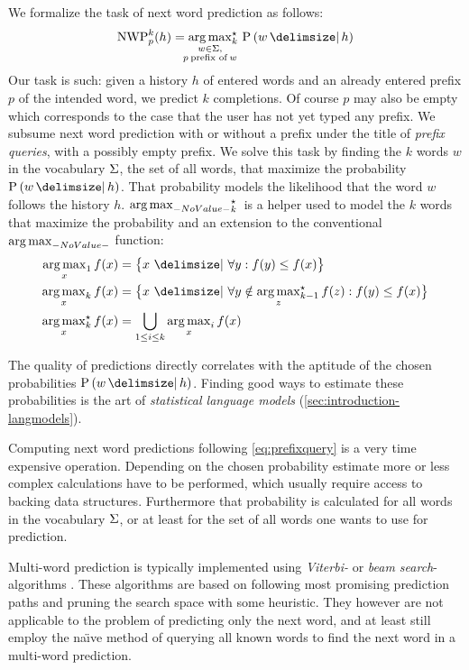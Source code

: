 We formalize the task of next word prediction as follows:
\begin{equation}
  \label{eq:prefixquery}
  \NWP[p][k]{h} =
    \Argmax*[k]{\mathclap{\substack{w \in \Vocab,\\p \: \text{prefix of} \: w}}}
      \Prob{w}{h}
\end{equation}
Our task is such: given a history $h$ of entered words and an already entered
prefix $p$ of the intended word, we predict $k$ completions.
Of course $p$ may also be empty which corresponds to the case that the user has
not yet typed any prefix.
We subsume next word prediction with or without a prefix under the title of
\emph{prefix queries}, with a possibly empty prefix.
We solve this task by finding the $k$ words $w$ in the vocabulary $\Sigma$, the
set of all words, that maximize the probability $\Prob{w}{h}$.
That probability models the likelihood that the word $w$ follows the history
$h$.
$\Argmax*[k]$ is a helper used to model the $k$ words that maximize the
probability and an extension to the conventional $\Argmax$ function:
\begin{subequations}
  \begin{align}
    \Argmax [1]{x} f(x) &= \big\{ x \,\Given\, \forall y : f(y) \leq f(x) \big\} \\
    \Argmax [k]{x} f(x) &= \big\{ x \,\Given\, \forall y \notin \Argmax*[k-1]{z} f(z) : f(y) \leq f(x) \big\} \\
    \Argmax*[k]{x} f(x) &= \bigcup_{{1 \leq i \leq k}} \Argmax[i]{x} f(x)
  \end{align}
\end{subequations}

The quality of predictions directly correlates with the aptitude of the chosen
probabilities $\Prob{w}{h}$.
Finding good ways to estimate these probabilities is the art of
\emph{statistical language models} (\cref{sec:introduction-langmodels}).

Computing next word predictions following \cref{eq:prefixquery} is a very time
expensive operation.
Depending on the chosen probability estimate more or less complex calculations
have to be performed, which usually require access to backing data structures.
Furthermore that probability is calculated for all words in the vocabulary
$\Sigma$, or at least for the set of all words one wants to use for prediction.

Multi-word prediction is typically implemented using \emph{Viterbi-} or
\emph{beam search}-algorithms \parencite{Bickel2005,JurafskyMartin2009}.
These algorithms are based on following most promising prediction paths and
pruning the search space with some heuristic.
They however are not applicable to the problem of predicting only the next
word, and at least \textcite{Bickel2005} still employ the na\"{\i}ve method of
querying all known words to find the next word in a multi-word prediction.

